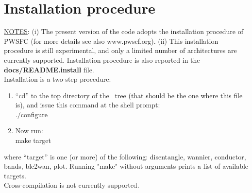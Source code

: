 
\thispagestyle{empty}
\section{Installation procedure}\label{section:install}

\noindent \underline {NOTES}: (i) The present version of the code
adopts the installation procedure of PWSFC (for more details see
also www.pwscf.org). (ii) This installation procedure is still
experimental, and only a limited number of architectures are
currently supported.
Installation procedure is also reported in the {\bf docs/README.install} file.\\

\noindent Installation is a two-step procedure:
\begin{enumerate}
\item ``cd'' to the top directory of the \WANT\ tree (that should be
the one where this file is), and issue this command at the shell
prompt:\\
$./$configure
\item Now run:\\
     make target\\
\end{enumerate}
\noindent where ``target'' is one (or more) of the following:
disentangle, wannier, conductor, bands, blc2wan, plot. Running
"make" without arguments prints a list of available targets.\\

\noindent Cross-compilation is not currently supported.


